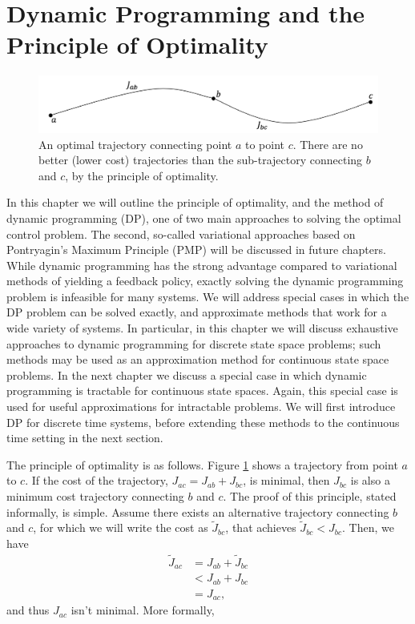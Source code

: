 \section{Dynamic Programming and the Principle of Optimality}

\begin{figure}[t]
    \centering
    \includegraphics[width=0.8\linewidth]{figs/optimality.png}
    \caption{An optimal trajectory connecting point $a$ to point $c$. There are no better (lower cost) trajectories than the sub-trajectory connecting $b$ and $c$, by the principle of optimality.}
    \label{fig:opt1}
\end{figure}

In this chapter we will outline the principle of optimality, and the method of dynamic programming (DP), one of two main approaches to solving the optimal control problem. The second, so-called variational approaches based on Pontryagin's Maximum Principle (PMP) will be discussed in future chapters. While dynamic programming has the strong advantage compared to variational methods of yielding a feedback policy, exactly solving the dynamic programming problem is infeasible for many systems. We will address special cases in which the DP problem can be solved exactly, and approximate methods that work for a wide variety of systems. In particular, in this chapter we will discuss exhaustive approaches to dynamic programming for discrete state space problems; such methods may be used as an approximation method for continuous state space problems. In the next chapter we discuss a special case in which dynamic programming is tractable for continuous state spaces. Again, this special case is used for useful approximations for intractable problems. 
We will first introduce DP for discrete time systems, before extending these methods to the continuous time setting in the next section.

The principle of optimality is as follows. Figure \ref{fig:opt1} shows a trajectory from point $a$ to $c$. If the cost of the trajectory, $J_{ac} = J_{ab} + J_{bc}$, is minimal, then $J_{bc}$ is also a minimum cost trajectory connecting $b$ and $c$. The proof of this principle, stated informally, is simple. Assume there exists an alternative trajectory connecting $b$ and $c$, for which we will write the cost as $\tilde{J}_{bc}$, that achieves $\tilde{J}_{bc} < J_{bc}$. Then, we have 
\begin{align}
    \tilde{J}_{ac} &= J_{ab} + \tilde{J}_{bc}\\
    &< J_{ab} + J_{bc}\\
    &= J_{ac},
\end{align}
and thus $J_{ac}$ isn't minimal. More formally,

